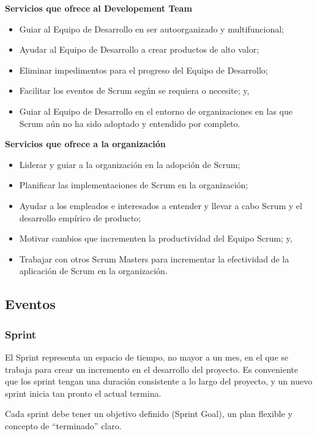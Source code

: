 \textbf{Servicios que ofrece al Developement Team}
	
\begin{itemize}
		  \item Guiar al Equipo de Desarrollo en ser autoorganizado y multifuncional;
		  \item Ayudar al Equipo de Desarrollo a crear productos de alto valor;
		  \item Eliminar impedimentos para el progreso del Equipo de Desarrollo;
		  \item Facilitar los eventos de Scrum según se requiera o necesite; y,
		  \item Guiar al Equipo de Desarrollo en el entorno de organizaciones en las que Scrum aún no ha sido adoptado y entendido por completo.
\end{itemize}
		\cite{scrum_guide}

\textbf{Servicios que ofrece a la organización}
	
\begin{itemize}
		  \item Liderar y guiar a la organización en la adopción de Scrum;
		  \item Planificar las implementaciones de Scrum en la organización; 
		  \item Ayudar a los empleados e interesados a entender y llevar a cabo Scrum y el desarrollo empírico de producto;
		  \item Motivar cambios que incrementen la productividad del Equipo Scrum; y,
		  \item Trabajar con otros Scrum Masters para incrementar la efectividad de la aplicación de Scrum en la organización.
\end{itemize}
		\cite{scrum_guide}
		
\subsection{Eventos}

\subsubsection{Sprint}

El Sprint representa un espacio de tiempo, no mayor a un mes, en el que se trabaja para crear un incremento en el desarrollo del proyecto. Es conveniente que los sprint tengan una duración consistente a lo largo del proyecto, y un nuevo sprint inicia tan pronto el actual termina.

Cada sprint debe tener un objetivo definido (Sprint Goal), un plan flexible y concepto de ``terminado'' claro. 

